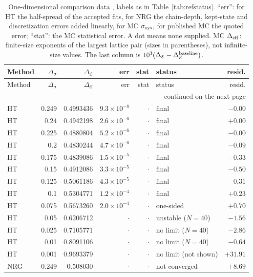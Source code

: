 \documentclass[11pt,a4paper]{article}
\numberwithin{equation}{section}
\newcommand{\De}{\Delta_{\mathcal E}}   %
\newcommand{\Ds}{\Delta_\sigma}
\newcommand{\sci}[2]{#1\times10^{#2}}
\begin{document}
{\small
\begin{longtable}{@{}l r r r r l r@{}}
\caption{One-dimensional comparison data \cite{noteHT,noteNRG,noteMC,Uzelac:2001lc,Angelini:2014koy},
labels as in Table~\ref{tab:refstatus}. ``err'': for HT the half-spread of the accepted fits,
for NRG the chain-depth, kept-state and discretization errors added linearly, for MC
$\sigma_{\rm sys}$, for published MC the quoted error; ``stat'': the MC statistical error. A dot
means none supplied. MC $\Delta_{\rm eff}$: finite-size exponents of the largest lattice pair
(sizes in parentheses), not infinite-size values. The last column is
$10^3(\De-\De^{\rm baseline})$.}\label{tab:refs1d}\\
\toprule Method & $\Ds$ & $\De$ & err & stat & status & resid.\\ \midrule\endfirsthead
\toprule Method & $\Ds$ & $\De$ & err & stat & status & resid.\\ \midrule\endhead
\midrule\multicolumn{7}{r}{continued on the next page}\\\endfoot
\bottomrule\endlastfoot
HT & 0.249 & 0.4993436 & $\sci{9.3}{-8}$ & $\cdot$ & final & $-0.00$\\
HT & 0.24 & 0.4942198 & $\sci{2.6}{-6}$ & $\cdot$ & final & $+0.00$\\
HT & 0.225 & 0.4880804 & $\sci{5.2}{-6}$ & $\cdot$ & final & $-0.00$\\
HT & 0.2 & 0.4830244 & $\sci{4.7}{-6}$ & $\cdot$ & final & $-0.09$\\
HT & 0.175 & 0.4839086 & $\sci{1.5}{-5}$ & $\cdot$ & final & $-0.33$\\
HT & 0.15 & 0.4912086 & $\sci{3.3}{-5}$ & $\cdot$ & final & $-0.50$\\
HT & 0.125 & 0.5061186 & $\sci{4.3}{-5}$ & $\cdot$ & final & $-0.31$\\
HT & 0.1 & 0.5304771 & $\sci{1.2}{-4}$ & $\cdot$ & final & $+0.23$\\
HT & 0.075 & 0.5673260 & $\sci{2.0}{-4}$ & $\cdot$ & one-sided & $+0.70$\\
HT & 0.05 & 0.6206712 & $\cdot$ & $\cdot$ & unstable ($N=40$) & $-1.56$\\
HT & 0.025 & 0.7105771 & $\cdot$ & $\cdot$ & no limit ($N=40$) & $-2.86$\\
HT & 0.01 & 0.8091106 & $\cdot$ & $\cdot$ & no limit ($N=40$) & $-0.64$\\
HT & 0.001 & 0.9693379 & $\cdot$ & $\cdot$ & no limit (not shown) & $+31.91$\\
NRG & 0.249 & 0.508030 & $\cdot$ & $\cdot$ & not converged & $+8.69$\\

\end{longtable}}
\end{document}
